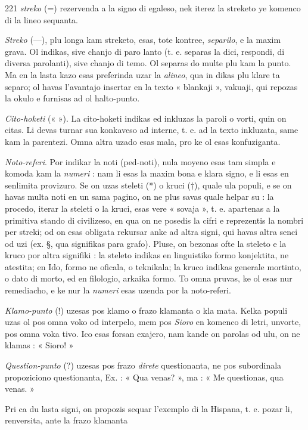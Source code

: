 \begin{VUpage}[225]{221}
\VUcontinue
\textit{streko} (=) rezervenda a la signo di egaleso, nek iterez la\nl
streketo ye komenco di la lineo sequanta.

\textit{Streko} (---), plu longa kam streketo, esas, tote kontree,\nl
\textit{separilo}, e la maxim grava. Ol indikas, sive chanjo di paro\cc
lanto (t. e. separas la dici, respondi, di diversa parolanti),\nl
sive chanjo di temo. Ol separas do multe plu kam la punto.\nl
Ma en la lasta kazo esas preferinda uzar la \textit{alineo}, qua in\cc
dikas plu klare ta separo; ol havas l'avantajo insertar en la\nl
texto « blankaji », vakuaji, qui repozas la okulo e furnisas\nl
ad ol halto-punto.

\textit{Cito-hoketi} (« »). La cito-hoketi indikas ed inkluzas la\nl
paroli o vorti, quin on citas. Li devas turnar sua konkaveso\nl
ad interne, t. e. ad la texto inkluzata, same kam la parentezi.\nl
Omna altra uzado esas mala, pro ke ol esas konfuziganta.\parplein

\textit{Noto-referi}. Por indikar la noti (ped-noti), nula moyeno\nl
esas tam simpla e komoda kam la \textit{numeri} : nam li esas la\nl
maxim bona e klara signo, e li esas en senlimita provizuro.\nl
Se on uzas steleti (*) o kruci (†), quale ula populi, e se on\nl
havas multa noti en un sama pagino, on ne plus savas quale\nl
helpar su : la procedo, iterar la steleti o la kruci, esas vere\nl
« sovaja », t. e. apartenas a la primitiva stando di civilizeso,\nl
en qua on ne posedis la cifri e reprezentis la nombri per\nl
streki; od on esas obligata rekursar anke ad altra signi,\nl
qui havas altra senci od uzi (ex. §, qua signifikas para\cc
grafo). Pluse, on bezonas ofte la steleto e la kruco por altra\nl
signifiki : la steleto indikas en linguistiko formo konjektita,\nl
ne atestita; en Ido, formo ne oficala, o teknikala; la kruco\nl
indikas generale mortinto, o dato di morto, ed en filologio,\nl
arkaika formo. To omna pruvas, ke ol esas nur remediacho,\nl
e ke nur la \textit{numeri} esas uzenda por la noto-referi.

\textit{Klamo-punto} (!) uzesas pos klamo o frazo klamanta o kla\cc
mata. Kelka populi uzas ol pos omna voko od interpelo,\nl
mem pos \textit{Sioro} en komenco di letri, unvorte, pos omna voka\cc
tivo. Ico esas forsan exajero, nam kande on parolas od ulu,\nl
on ne klamas : « Sioro! »

\textit{Question-punto} (?) uzesas pos frazo \textit{direte} questionanta,\nl
ne pos subordinala propoziciono questionanta, Ex. : « Qua\nl
venas? », ma : « Me questionas, qua venas. »

Pri ca du lasta signi, on propozis sequar l'exemplo di la\nl
Hispana, t. e. pozar li, renversita, ante la frazo klamanta\nl
\end{VUpage}

